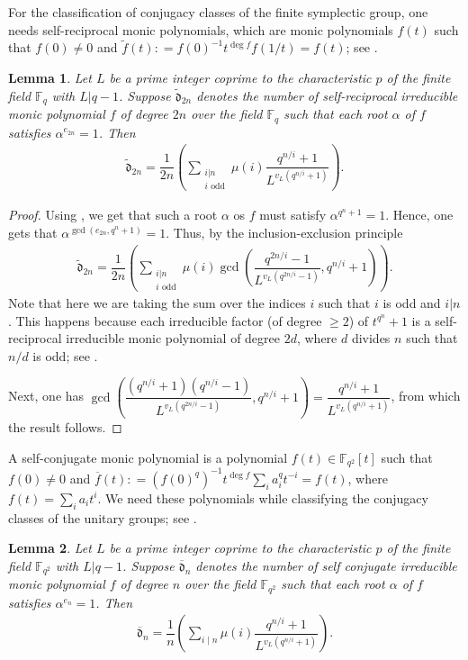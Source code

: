 \documentclass[11pt,twoside]{amsart}
\newcommand{\F}{\mathbb{F}}
\renewcommand{\d}{\mathfrak d}
\newtheorem{lemma}{Lemma}[section]
\theoremstyle{definition} %
\begin{document}
For the classification of conjugacy classes of the finite symplectic group, one needs self-reciprocal monic polynomials, which are monic polynomials $f(t)$ such that $f(0)\neq 0$ and $\widetilde{f}(t)\colon=f(0)^{-1}t^{\deg f}f(1/t)=f(t)$; see \cite{Wall1963}.
\begin{lemma}\label{lem:symp-count-root}
    Let $L$ be a prime integer coprime to the characteristic $p$ of the finite field $\F_q$ with $L|q-1$.
    Suppose $\widetilde{\d}_{2n}$ denotes the number of self-reciprocal irreducible monic polynomial $f$ of degree $2n$ over the field $\F_q$ such that each root $\alpha$ of $f$ satisfies $\alpha^{e_{2n}}=1$. 
    Then
    \begin{align*}
        \widetilde{\d}_{2n}=\dfrac{1}{2n}\left(\sum\limits_{\substack{i|n\\i\,\,\text{odd}}}\mu\left({i}\right)\dfrac{q^{n/i}+1}{L^{v_L(q^{n/i}+1)}}\right).
    \end{align*}
\end{lemma}
\begin{proof}
    Using \cite[Theorem 1]{MeynGotz1990}, we get that such a root $\alpha$ os $f$ must satisfy $\alpha^{q^n+1}=1$. 
    Hence, one gets that $\alpha^{\gcd(e_{2n},q^n+1)}=1$.
    Thus, by the inclusion-exclusion principle 
    \begin{align*}
        \widetilde{\d}_{2n}=\dfrac{1}{2n}\left(\sum\limits_{\substack{i|n\\i\,\,\text{odd}}}\mu\left(i\right)\gcd\left(\dfrac{q^{2n/i}-1}{L^{v_L(q^{2n/i}-1)}},q^{n/i}+1\right)\right).
    \end{align*}
    Note that here we are taking the sum over the indices $i$ such that $i$ is odd and $i|n$.
    This happens because each irreducible factor (of degree $\geq2$) of $t^{q^n}+1$ is a self-reciprocal irreducible monic polynomial of degree $2d$, where $d$ divides $n$ such that $n/d$ is odd; see \cite[Theorem 1]{MeynGotz1990}.

    Next, one has $\gcd\left(\dfrac{(q^{n/i}+1)(q^{n/i}-1)}{L^{v_L(q^{2n/i}-1)}},q^{n/i}+1\right)=\dfrac{q^{n/i}+1}{L^{v_L(q^{n/i}+1)}}$, from which the result follows.
\end{proof}
A self-conjugate monic polynomial is a polynomial $f(t)\in\F_{q^2}[t]$ such that $f(0)\neq0$ and $\overline{f}(t)\colon=(f(0)^q)^{-1}t^{\deg f}\sum\limits_{i}a_i^qt^{-i}=f(t)$, where $f(t)=\sum\limits_{i} a_it^i$. 
We need these polynomials while classifying the conjugacy classes of the unitary groups; see \cite{Wall1963}.
\begin{lemma}\label{lem:uni-count-root}
    Let $L$ be a prime integer coprime to the characteristic $p$ of the finite field $\F_{q^2}$ with $L|q-1$.
    Suppose $\overline{\d}_{n}$ denotes the number of self conjugate irreducible monic polynomial $f$ of degree $n$ over the field $\F_{q^2}$ such that each root $\alpha$ of $f$ satisfies $\alpha^{e_{n}}=1$. 
    Then
    \begin{align*}
        \overline{\d}_{n}=\dfrac{1}{n}\left(\sum\limits_{i\mid n}\mu\left({i}\right)\dfrac{q^{n/i}+1}{L^{v_L(q^{n/i}+1)}}\right).
    \end{align*}
\end{lemma}
\end{document}
